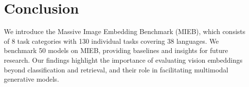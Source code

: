 \section{Conclusion}

We introduce the Massive Image Embedding Benchmark (MIEB), which consists of 8 task categories with 130 individual tasks covering 38 languages. We benchmark 50 models on MIEB, providing baselines and insights for future research. Our findings highlight the importance of evaluating vision embeddings beyond classification and retrieval, and their role in facilitating multimodal generative models.